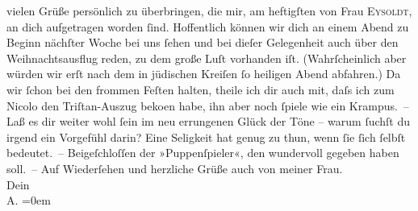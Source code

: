 \begin{ledgroupsized}[t]{13cm}
               vielen Grüße persönlich zu überbringen, die mir, am heftigſten von Frau \textsc{Eysoldt}, an dich aufgetragen worden ſind. Hoffentlich können wir dich an einem Abend zu
               Beginn nächſter Woche bei uns ſehen {\pb}und bei dieſer
               Gelegenheit auch über den Weihnachtsausflug reden, zu dem große Luſt vorhanden iſt.
               (Wahrſcheinlich aber würden wir erſt nach dem in jüdischen Kreiſen ſo heiligen Abend
               abfahren.) Da wir ſchon bei den frommen Feſten halten, theile ich dir auch mit, daſs
               ich zum Nicolo den Triſtan-Auszug beko{\geminationm}en habe, ihn aber {\pb}noch ſpiele wie ein
               Krampus. –\pend
           \pstart
           Laß es dir weiter wohl ſein im neu errungenen Glück der Töne – warum ſuchſt du irgend
               ein Vorgefühl darin? Eine Seligkeit hat genug 
               zu thun, wenn ſie ſich ſelbſt bedeutet. – \pend
           \pstart
           Beigeſchloſſen der »Puppenſpieler«, den \label{K_L01475_2v}\label{K_L01475_2h} wundervoll gegeben haben soll. –\pend
           \pstart
           Auf Wiederſehen und herzliche Grüße {\pb}auch von meiner Frau.{\\[\baselineskip]}Dein{\\[\baselineskip]}\spacefill\mbox{A.}\pend
           \leftskip=0em{}\endnumbering{}\end{ledgroupsized}  \newcommand{\dateiname}{L01475}\newcommand{\titel}{Arthur Schnitzler an Hermann Bahr, 5. 12. 1904}\newcommand{\editorInnen}{ Kurt Ifkovits,  Martin Anton Müller}
            \footnotesize
\begin{ledgroupsized}[t]{11.5cm}
\end{ledgroupsized}
         
      